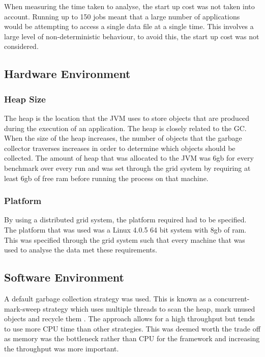 When measuring the time taken to analyse, the start up cost was not taken into account. Running up to 150 jobs meant that a large number of applications would be attempting to access a single data file at a single time. This involves a large level of non-deterministic behaviour, to avoid this, the start up cost was not considered.

\subsection{Hardware Environment}
\subsubsection{Heap Size}

The heap is the location that the JVM uses to store objects that are produced during the execution of an application. The heap is closely related to the GC. When the size of the heap increases, the number of objects that the garbage collector traverses increases in order to determine which objects should be collected. The amount of heap that was allocated to the JVM was 6gb for every benchmark over every run and was set through the grid system by requiring at least 6gb of free ram before running the process on that machine.

\subsubsection{Platform}

By using a distributed grid system, the platform required had to be specified. The platform that was used was a Linux 4.0.5 64 bit system with 8gb of ram. This was specified through the grid system such that every machine that was used to analyse the data met these requirements.

\subsection{Software Environment}

A default garbage collection strategy was used. This is known as a concurrent-mark-sweep strategy which uses multiple threads to scan the heap, mark unused objects and recycle them \cite{oracle2015}. The approach allows for a high throughput but tends to use more CPU time than other strategies. This was deemed worth the trade off as memory was the bottleneck rather than CPU for the framework and increasing the throughput was more important.

